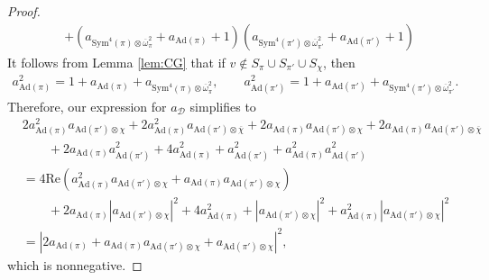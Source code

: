 \documentclass[10pt,a4paper]{amsart}
\begin{document}
\begin{proof}
\begin{align*}
&+(a_{\mathrm{Sym}^4(\pi)\otimes\overline{\omega}_{\pi}^2}+a_{\mathrm{Ad}(\pi)}+1)(a_{\mathrm{Sym}^4(\pi')\otimes\overline{\omega}_{\pi'}^2}+a_{\mathrm{Ad}(\pi')}+1)
\end{align*}
It follows from Lemma \ref{lem:CG} that if $v\notin S_{\pi}\cup S_{\pi'}\cup S_{\chi}$, then
\begin{align*}
a_{\mathrm{Ad}(\pi)}^2=1+a_{\mathrm{Ad}(\pi)}+a_{\mathrm{Sym}^4(\pi)\otimes\overline{\omega}_{\pi}^2},\qquad a_{\mathrm{Ad}(\pi')}^2=1+a_{\mathrm{Ad}(\pi')}+a_{\mathrm{Sym}^4(\pi')\otimes\overline{\omega}_{\pi'}^2}.
\end{align*}
Therefore, our expression for $a_{\mathcal{D}}$ simplifies to
\begin{align*}
&2a_{\mathrm{Ad}(\pi)}^2 a_{\mathrm{Ad}(\pi')\otimes\chi}+2a_{\mathrm{Ad}(\pi)}^2 a_{\mathrm{Ad}(\pi')\otimes\overline{\chi}}+2a_{\mathrm{Ad}(\pi)}a_{\mathrm{Ad}(\pi')\otimes\chi}+2a_{\mathrm{Ad}(\pi)}a_{\mathrm{Ad}(\pi')\otimes\overline{\chi}}\\
&\qquad +2 a_{\mathrm{Ad}(\pi)} a_{\mathrm{Ad}(\pi')}^2+4 a_{\mathrm{Ad}(\pi)}^2+a_{\mathrm{Ad}(\pi')}^2+a_{\mathrm{Ad}(\pi)}^2 a_{\mathrm{Ad}(\pi')}^2\\
&=4 \mathrm{Re}(a_{\text{Ad}(\pi)}^2 a_{\text{Ad}(\pi')\otimes\chi}+a_{\text{Ad}(\pi)} a_{\text{Ad}(\pi')\otimes\chi})\\
&\qquad+2 a_{\text{Ad}(\pi)} |a_{\text{Ad}(\pi')\otimes\chi}|^2+4 a_{\text{Ad}(\pi)}^2+|a_{\text{Ad}(\pi')\otimes\chi}|^2+a_{\text{Ad}(\pi)}^2 |a_{\text{Ad}(\pi')\otimes\chi}|^2\\
&=|2a_{\mathrm{Ad}(\pi)}+a_{\mathrm{Ad}(\pi)}a_{\mathrm{Ad}(\pi')\otimes\chi}+a_{\mathrm{Ad}(\pi')\otimes\chi}|^2,
\end{align*}
which is nonnegative.
\end{proof}
\end{document}
